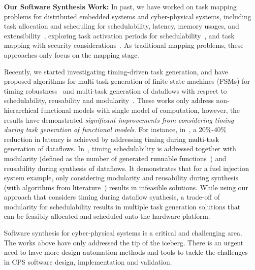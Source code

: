 \smallskip
\noindent
\textbf{Our Software Synthesis Work:} In past, we have worked on task mapping problems for distributed embedded systems and cyber-physical systems, including task allocation and scheduling for schedulability, latency, memory usages, and extensibility~\cite{Zhu_RTAS09, Zhu_TII10, Zhu_TECS12, Zeng_TECS14}, exploring task activation periods for schedulability~\cite{Davare_DAC07}, and task mapping with security considerations~\cite{Lin_ICCAD13, Lin_ICCAD14, Lin_TODAES15}. As traditional mapping problems, these approaches only focus on the mapping stage.

Recently, we started investigating timing-driven task generation, and have proposed algorithms for multi-task generation of finite state machines (FSMs) for timing robustness~\cite{Zhu_DATE13} and multi-task generation of dataflows with respect to schedulability, reusability and modularity~\cite{Deng_SIES14, Deng_ICCPS15}.  These works only address non-hierarchical functional models with single model of computation, however, the results have demonstrated \textit{significant improvements from considering timing during task generation of functional models}. For instance, in~\cite{Deng_SIES14}, a $20\%$-$40\%$ reduction in latency is achieved by addressing timing during multi-task generation of dataflows. In~\cite{Deng_ICCPS15}, timing schedulability is addressed together with modularity (defined as the number of generated runnable functions~\cite{Lublinerman_POPL09, Lublinerman_DATE08}) and reusability during synthesis of dataflows. It demonstrates that for a fuel injection system example, only considering modularity and reusability during synthesis (with algorithms from literature~\cite{Lublinerman_POPL09, Lublinerman_DATE08}) results in infeasible solutions. While using our approach that considers timing during dataflow synthesis, a trade-off of modularity for schedulability results in multiple task generation solutions that can be feasibly allocated and scheduled onto the hardware platform.

Software synthesis for cyber-physical systems is a critical and challenging area. The works above have only addressed the tip of the iceberg. There is an urgent need to have more design automation methods and tools to tackle the challenges in CPS software design, implementation and validation.

